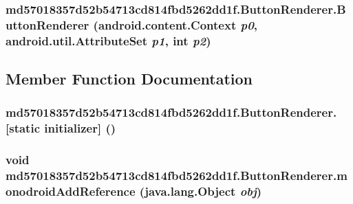 \hypertarget{classmd57018357d52b54713cd814fbd5262dd1f_1_1_button_renderer_49a2994aa5791809343aab825cacd93d}{
\subsubsection[{ButtonRenderer}]{\setlength{\rightskip}{0pt plus 5cm}md57018357d52b54713cd814fbd5262dd1f.ButtonRenderer.ButtonRenderer (android.content.Context {\em p0}, \/  android.util.AttributeSet {\em p1}, \/  int {\em p2})}}
\label{classmd57018357d52b54713cd814fbd5262dd1f_1_1_button_renderer_49a2994aa5791809343aab825cacd93d}




\subsection{Member Function Documentation}
\hypertarget{classmd57018357d52b54713cd814fbd5262dd1f_1_1_button_renderer_0849ae44a116078b51fce5fadbd7f4b7}{
\subsubsection[{[static initializer]}]{\setlength{\rightskip}{0pt plus 5cm}md57018357d52b54713cd814fbd5262dd1f.ButtonRenderer.\mbox{[}static initializer\mbox{]} ()}}
\label{classmd57018357d52b54713cd814fbd5262dd1f_1_1_button_renderer_0849ae44a116078b51fce5fadbd7f4b7}


\hypertarget{classmd57018357d52b54713cd814fbd5262dd1f_1_1_button_renderer_1901dfa607086d1752758dedb7ebb877}{
\subsubsection[{monodroidAddReference}]{\setlength{\rightskip}{0pt plus 5cm}void md57018357d52b54713cd814fbd5262dd1f.ButtonRenderer.monodroidAddReference (java.lang.Object {\em obj})}}
\label{classmd57018357d52b54713cd814fbd5262dd1f_1_1_button_renderer_1901dfa607086d1752758dedb7ebb877}


